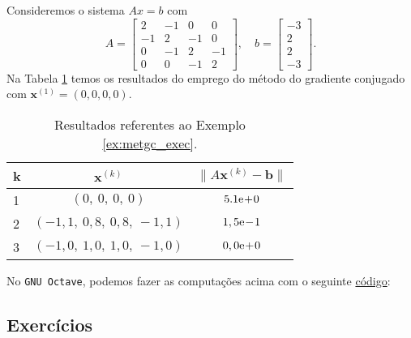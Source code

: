 \begin{ex}\label{ex:metgc_exec}
  Consideremos o sistema $Ax = b$ com
  \begin{equation}
    A =
    \begin{bmatrix}
      2 & -1 & 0 & 0\\
      -1 & 2 & -1 & 0\\
      0 & -1 & 2 & -1 \\
      0 & 0 & -1 & 2
    \end{bmatrix},\quad
    b =
    \begin{bmatrix}
      -3\\
      2\\
      2\\
      -3
    \end{bmatrix}.
  \end{equation}
  Na Tabela \ref{tab:metgc_exec} temos os resultados do emprego do método do gradiente conjugado com $\pmb{x}^{(1)} = (0, 0, 0, 0)$.

  \begin{table}[h!]
    \centering
    \caption{Resultados referentes ao Exemplo \ref{ex:metgc_exec}.}
    \label{tab:metgc_exec}
    \begin{tabular}{l|c|c}
      k & $\pmb{x}^{(k)}$ & $\|A\pmb{x}^{(k)}-\pmb{b}\|$\\\hline
      1 & $(0,~0,~0,~0)$ & $5.1\mathrm{e}\!+\!0$\\
      2 & $(-1,1,~0,8,~0,8,~-1,1)$ & $1,5\mathrm{e}\!-\!1$\\
      3 & $(-1,0,~1,0,~1,0,~-1,0)$ & $0,0\mathrm{e}\!+\!0$\\\hline
    \end{tabular}
  \end{table}

\ifisoctave
No \verb+GNU Octave+, podemos fazer as computações acima com o seguinte \href{https://github.com/phkonzen/notas/blob/master/src/MatematicaNumerica/cap_sl_iter/dados/ex_metgc_exec/ex_metgc_exec.m}{código}:

\fi
\end{ex}

\subsection*{Exercícios}

\emconstrucao